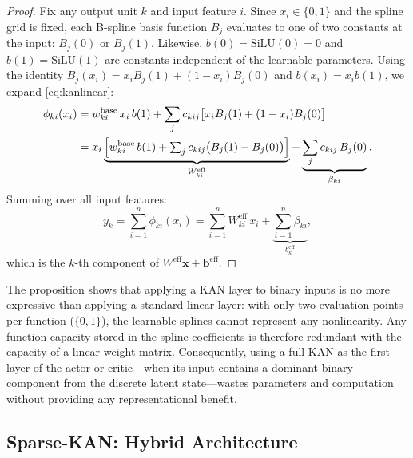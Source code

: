 \documentclass[11pt, a4paper]{article}
\begin{document}
\begin{proof}
Fix any output unit $k$ and input feature $i$. Since $x_i \in \{0, 1\}$ and
the spline grid is fixed, each B-spline basis function $B_j$ evaluates to one
of two constants at the input: $B_j(0)$ or $B_j(1)$. Likewise, $b(0) =
\mathrm{SiLU}(0) = 0$ and $b(1) = \mathrm{SiLU}(1)$ are constants independent
of the learnable parameters. Using the identity $B_j(x_i) = x_i B_j(1) +
(1 - x_i) B_j(0)$ and $b(x_i) = x_i b(1)$, we expand \eqref{eq:kanlinear}:
\begin{align}
  \phi_{ki}(x_i)
  &= w^{\mathrm{base}}_{ki}\, x_i\, b(1)
   + \sum_{j} c_{kij} \bigl[ x_i B_j(1) + (1 - x_i) B_j(0) \bigr] \notag \\
  &= x_i \underbrace{\Bigl[ w^{\mathrm{base}}_{ki}\, b(1)
       + \textstyle\sum_{j} c_{kij}\bigl(B_j(1) - B_j(0)\bigr) \Bigr]}_{W^{\mathrm{eff}}_{ki}}
   + \underbrace{\sum_{j} c_{kij}\, B_j(0)}_{\beta_{ki}}.
\end{align}
Summing over all input features:
\begin{equation}
  y_k = \sum_{i=1}^{n} \phi_{ki}(x_i)
      = \sum_{i=1}^{n} W^{\mathrm{eff}}_{ki}\, x_i
        + \underbrace{\sum_{i=1}^{n} \beta_{ki}}_{b^{\mathrm{eff}}_k},
\end{equation}
which is the $k$-th component of $W^{\mathrm{eff}}\mathbf{x} + \mathbf{b}^{\mathrm{eff}}$.
\end{proof}

The proposition shows that applying a KAN layer to binary inputs is no more
expressive than applying a standard linear layer: with only two evaluation
points per function ($\{0, 1\}$), the learnable splines cannot represent any
nonlinearity. Any function capacity stored in the spline coefficients is
therefore redundant with the capacity of a linear weight matrix. Consequently,
using a full KAN as the first layer of the actor or critic---when its input
contains a dominant binary component from the discrete latent state---wastes
parameters and computation without providing any representational benefit.

\subsection{Sparse-KAN: Hybrid Architecture}
\end{document}
